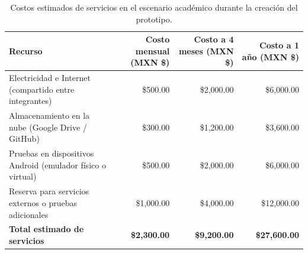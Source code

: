 \begin{table}[H]
	\centering
	\renewcommand{\arraystretch}{1.6}
	\setlength{\tabcolsep}{12pt}
	\Huge %
	\begin{adjustbox}{max width=\textwidth}
		\begin{tabular}{|p{7cm}|r|r|r|}
			\hline
			\textbf{Recurso} & \textbf{Costo mensual (MXN \$)} & \textbf{Costo a 4 meses (MXN \$)} & \textbf{Costo a 1 año (MXN \$)} \\ \hline
			Electricidad e Internet (compartido entre integrantes) & \$500.00 & \$2,000.00 & \$6,000.00 \\ \hline
			Almacenamiento en la nube (Google Drive / GitHub) & \$300.00 & \$1,200.00 & \$3,600.00 \\ \hline
			Pruebas en dispositivos Android (emulador físico o virtual) & \$500.00 & \$2,000.00 & \$6,000.00 \\ \hline
			Reserva para servicios externos o pruebas adicionales & \$1,000.00 & \$4,000.00 & \$12,000.00 \\ \hline
			\textbf{Total estimado de servicios} & \textbf{\$2,300.00} & \textbf{\$9,200.00} & \textbf{\$27,600.00} \\ \hline
		\end{tabular}
	\end{adjustbox}
	\caption{Costos estimados de servicios en el escenario académico durante la creación del prototipo.}
	\label{tab:costos_servicios}
\end{table}



